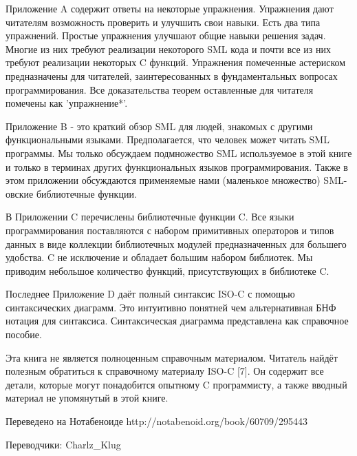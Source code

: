 Приложение A содержит ответы на некоторые упражнения. Упражнения дают читателям возможность проверить и улучшить свои навыки. Есть два типа упражнений. Простые упражнения улучшают общие навыки решения задач. Многие из них требуют реализации некоторого SML кода и почти все из них требуют реализации некоторых C функций. Упражнения помеченные астериском предназначены для читателей, заинтересованных в фундаментальных вопросах программирования. Все доказательства теорем оставленные для читателя помечены как 'упражнение*'.

Приложение B - это краткий обзор SML для людей, знакомых с другими функциональными языками. Предполагается, что человек может читать SML программы. Мы только обсуждаем подмножество SML используемое в этой книге и только в терминах других функциональных языков программирования. Также в этом приложении обсуждаются применяемые нами (маленькое множество) SML-овские библиотечные функции.

В Приложении C перечислены библиотечные функции C. Все языки программирования поставляются с набором примитивных операторов и типов данных в виде коллекции библиотечных модулей предназначенных для большего удобства. C не исключение и обладает большим набором библиотек. Мы приводим небольшое количество функций, присутствующих в библиотеке C.

Последнее Приложение D даёт полный синтаксис ISO-C с помощью синтаксических диаграмм. Это интуитивно понятней чем альтернативная БНФ нотация для синтаксиса. Синтаксическая диаграмма представлена как справочное пособие.

Эта книга не является полноценным справочным материалом. Читатель найдёт полезным обратиться к справочному материалу ISO-C [7]. Он содержит все детали, которые могут понадобится опытному C программисту, а также вводный материал не упомянутый в этой книге.

Переведено на Нотабеноиде
http://notabenoid.org/book/60709/295443

Переводчики: Charlz\_Klug
